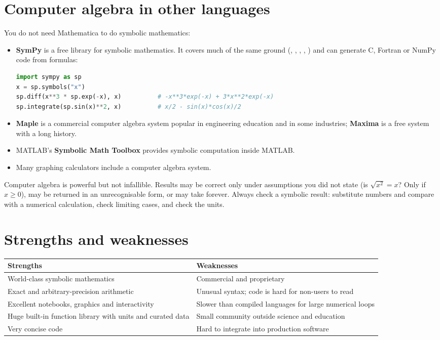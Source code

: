\section{Computer algebra in other languages}

You do not need Mathematica to do symbolic mathematics:
\begin{itemize}
\item \textbf{SymPy} is a free \py library for symbolic mathematics. It covers much of the
  same ground (, , , , )
  and can generate C, Fortran or NumPy code from formulas:
\begin{lstlisting}[language=Python]
import sympy as sp
x = sp.symbols("x")
sp.diff(x**3 * sp.exp(-x), x)          # -x**3*exp(-x) + 3*x**2*exp(-x)
sp.integrate(sp.sin(x)**2, x)          # x/2 - sin(x)*cos(x)/2
\end{lstlisting}
\item \textbf{Maple} is a commercial computer algebra system popular in engineering
  education and in some industries; \textbf{Maxima} is a free system with a long history.
\item MATLAB's \textbf{Symbolic Math Toolbox} provides symbolic computation inside
  MATLAB.
\item Many graphing calculators include a computer algebra system.
\end{itemize}

\begin{engnote}
Computer algebra is powerful but not infallible. Results may be correct only under
assumptions you did not state (is $\sqrt{x^2} = x$? Only if $x \ge 0$), may be returned in
an unrecognisable form, or may take forever. Always check a symbolic result: substitute
numbers and compare with a numerical calculation, check limiting cases, and check the
units.
\end{engnote}

\section{Strengths and weaknesses}

\begin{center}
\small
\begin{tabularx}{\linewidth}{@{}>{\raggedright\arraybackslash}X>{\raggedright\arraybackslash}X@{}}
\toprule
\textbf{Strengths} & \textbf{Weaknesses}\\
\midrule
World-class symbolic mathematics & Commercial and proprietary\\
Exact and arbitrary-precision arithmetic & Unusual syntax; code is hard for non-users to read\\
Excellent notebooks, graphics and interactivity & Slower than compiled languages for large numerical loops\\
Huge built-in function library with units and curated data & Small community outside science and education\\
Very concise code & Hard to integrate into production software\\
\bottomrule
\end{tabularx}
\end{center}

